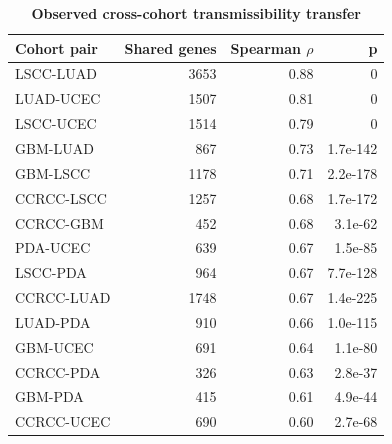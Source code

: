 \documentclass[times, twoside]{zHenriquesLab-StyleBioRxiv}
\begin{document}
\begin{table}[tbp]
\centering
{\footnotesize
\begin{tabular}{@{}lrrr@{}}
\toprule
\textbf{Cohort pair} & \textbf{Shared genes} & \textbf{Spearman $\rho$} & \textbf{p} \\
\midrule
LSCC-LUAD & 3653 & 0.88 & 0 \\
LUAD-UCEC & 1507 & 0.81 & 0 \\
LSCC-UCEC & 1514 & 0.79 & 0 \\
GBM-LUAD & 867 & 0.73 & 1.7e-142 \\
GBM-LSCC & 1178 & 0.71 & 2.2e-178 \\
CCRCC-LSCC & 1257 & 0.68 & 1.7e-172 \\
CCRCC-GBM & 452 & 0.68 & 3.1e-62 \\
PDA-UCEC & 639 & 0.67 & 1.5e-85 \\
LSCC-PDA & 964 & 0.67 & 7.7e-128 \\
CCRCC-LUAD & 1748 & 0.67 & 1.4e-225 \\
LUAD-PDA & 910 & 0.66 & 1.0e-115 \\
GBM-UCEC & 691 & 0.64 & 1.1e-80 \\
CCRCC-PDA & 326 & 0.63 & 2.8e-37 \\
GBM-PDA & 415 & 0.61 & 4.9e-44 \\
CCRCC-UCEC & 690 & 0.60 & 2.7e-68 \\
\bottomrule
\end{tabular}
}
\caption{\textbf{Observed cross-cohort transmissibility transfer}}
\label{tab:transfer}
\end{table}


\end{document}

